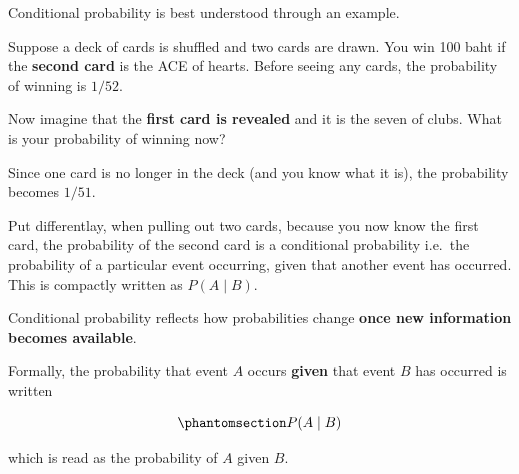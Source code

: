 \documentclass[
  letterpaper,
  DIV=11,
  numbers=noendperiod]{scrreprt}
\begin{document}
Conditional probability is best understood through an example.

Suppose a deck of cards is shuffled and two cards are drawn. You win 100
baht if the \textbf{second card} is the ACE of hearts. Before seeing any
cards, the probability of winning is \(1/52\).

Now imagine that the \textbf{first card is revealed} and it is the seven
of clubs. What is your probability of winning now?

Since one card is no longer in the deck (and you know what it is), the
probability becomes \(1/51\).

Put differentlay, when pulling out two cards, because you now know the
first card, the probability of the second card is a conditional
probability i.e.~the probability of a particular event occurring, given
that another event has occurred. This is compactly written as
\(P(A \mid B)\).

\begin{tcolorbox}[enhanced jigsaw, coltitle=black, colbacktitle=quarto-callout-important-color!10!white, left=2mm, bottomrule=.15mm, bottomtitle=1mm, colback=white, titlerule=0mm, colframe=quarto-callout-important-color-frame, breakable, leftrule=.75mm, toptitle=1mm, opacitybacktitle=0.6, rightrule=.15mm, title=\textcolor{quarto-callout-important-color}{\faExclamation}\hspace{0.5em}{Conditional probability}, arc=.35mm, opacityback=0, toprule=.15mm]

Conditional probability reflects how probabilities change \textbf{once
new information becomes available}.

\end{tcolorbox}

Formally, the probability that event \(A\) occurs \textbf{given} that
event \(B\) has occurred is written

\begin{equation}\phantomsection\label{eq-conditional-prob}{
P(A \mid B)
}\end{equation}

which is read as the probability of \(A\) given \(B\).
\end{document}
